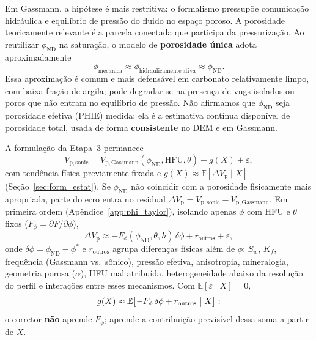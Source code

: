 \documentclass[11pt,a4paper]{article}
\numberwithin{equation}{section}
\newcommand{\phiND}{\ensuremath{\phi_{\mathrm{ND}}}}
\begin{document}
Em Gassmann, a hipótese é mais restritiva: o formalismo pressupõe
comunicação hidráulica e equilíbrio de pressão do fluido no espaço poroso.
A porosidade teoricamente relevante é a parcela conectada que participa da
pressurização.
Ao reutilizar \phiND{} na saturação, o modelo de \textbf{porosidade única}
adota aproximadamente
\begin{equation}
  \phi_{\mathrm{mecanica}}
  \approx
  \phi_{\mathrm{hidraulicamente\ ativa}}
  \approx
  \phiND{}.
\end{equation}
Essa aproximação é comum e mais defensável em carbonato relativamente
limpo, com baixa fração de argila; pode degradar-se na presença de vugs
isolados ou poros que não entram no equilíbrio de pressão.
Não afirmamos que \phiND{} seja porosidade efetiva (PHIE) medida: ela é a
estimativa contínua disponível de porosidade total, usada de forma
\textbf{consistente} no DEM e em Gassmann.

A formulação da Etapa~3 permanece
\begin{equation}
  V_{\mathrm{p,sonic}}
  =
  V_{\mathrm{p,Gassmann}}(\phiND{},\mathrm{HFU},\theta)
  + g(X) + \varepsilon,
\end{equation}
com tendência física previamente fixada e
$g(X)\approx\mathbb{E}[\Delta V_{\mathrm{p}}\mid X]$
(Seção~\ref{sec:form_estat}).
Se \phiND{} não coincidir com a porosidade fisicamente mais apropriada,
parte do erro entra no residual
$\Delta V_{\mathrm{p}} = V_{\mathrm{p,sonic}} - V_{\mathrm{p,Gassmann}}$.
Em primeira ordem (Apêndice~\ref{app:phi_taylor}), isolando apenas $\phi$
com HFU e $\theta$ fixos ($F_\phi=\partial F/\partial\phi$),
\begin{equation}
  \label{eq:dvp_phi_taylor}
  \Delta V_{\mathrm{p}}
  \approx
  -F_\phi(\phiND{},\theta,h)\,\delta\phi
  + r_{\mathrm{outros}} + \varepsilon,
\end{equation}
onde $\delta\phi=\phiND{}-\phi^{*}$ e $r_{\mathrm{outros}}$ agrupa
diferenças físicas além de $\phi$: $S_w$, $K_f$, frequência
(Gassmann vs.\ sônico), pressão efetiva, anisotropia, mineralogia,
geometria porosa ($\alpha$), HFU mal atribuída, heterogeneidade abaixo
da resolução do perfil e interações entre esses mecanismos.
Com $\mathbb{E}[\varepsilon\mid X]=0$,
\begin{equation}
  g(X)
  \approx
  \mathbb{E}\bigl[-F_\phi\,\delta\phi + r_{\mathrm{outros}}\bigm| X\bigr]:
\end{equation}
o corretor \textbf{não} aprende $F_\phi$; aprende a contribuição
previsível dessa soma a partir de $X$.
\end{document}
